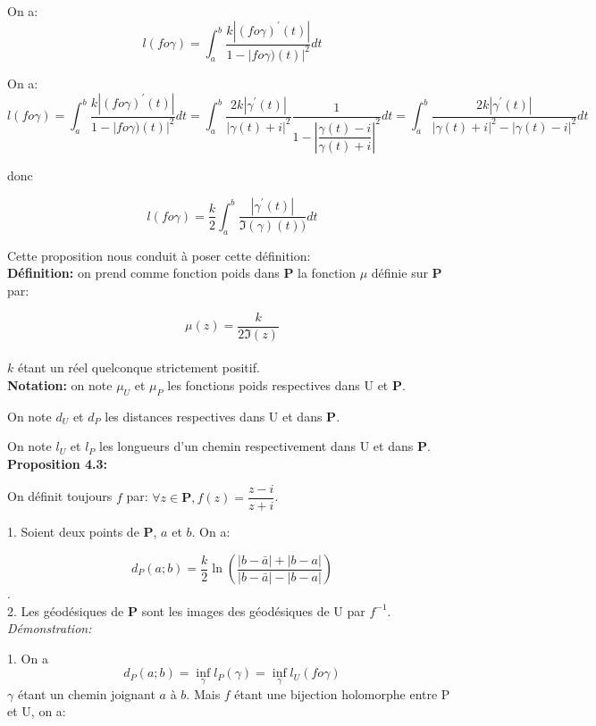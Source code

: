 \documentclass[a4paper, 12pt, twoside]{book}
\begin{document}
On a:
$$l(fo\gamma)=\int_{a}^{b}\dfrac{k|(fo\gamma)^{'}(t)|}{1-|fo\gamma)(t)|^{2}}dt$$

On a:
$$l(fo\gamma)=\int_{a}^{b}\dfrac{k|(fo\gamma)^{'}(t)|}{1-|fo\gamma)(t)|^{2}}dt=\int_{a}^{b}\dfrac{2k|\gamma^{'}(t)|}{|\gamma(t)+i|^{2}}\dfrac{1}{1-|\dfrac{\gamma(t)-i}{\gamma(t)+i}|^{2}}dt=\int_{a}^{b}\dfrac{2k|\gamma^{'}(t)|}{|\gamma(t)+i|^{2}-|\gamma(t)-i|^{2}}dt$$ 

donc


$$l(fo\gamma)=\dfrac{k}{2}\int_{a}^{b}\dfrac{|\gamma^{'}(t)|}{\Im(\gamma)(t))}dt$$





Cette proposition nous conduit à poser cette définition:\\

\textbf{Définition:} on prend comme fonction poids dans \textbf{P} la fonction $\mu$ définie sur \textbf{P} par:\

$$\mu(z)= \dfrac{k}{2\Im(z)}$$\\ $k$ étant un réel quelconque strictement positif.\\


\textbf{Notation:} on note $\mu_{U}$ et $\mu_{P}$ les fonctions poids respectives dans U et \textbf{P}.\

On note $d_{U}$ et $d_{P}$ les distances respectives dans U et dans \textbf{P}.\

On note $l_{U}$ et $l_{P}$ les longueurs d'un chemin respectivement dans U et dans \textbf{P}.\\




\newpage  \textbf{Proposition 4.3:}

 On définit toujours $f$ par: $\forall z\in \boldsymbol{P}, f(z)=\dfrac{z-i}{z+i}$.\
 
1. Soient deux points de \textbf{P}, $a$ et $b$. On a:\

$$d_{P}(a; b)= \dfrac{k}{2}\ln(\dfrac{|b-\bar{a}|+|b-a|}{|b-\bar{a}|-|b-a|})$$.\\

2. Les géodésiques de \textbf{P} sont les images des géodésiques de U par $f^{-1}$.\\


\textit{Démonstration:}\


1. On a  $$d_{P}(a; b)=\inf_{\gamma}l_{P}(\gamma)=\inf_{\gamma}l_{U}(fo\gamma)$$
$\gamma$ étant un chemin joignant $a$ à $b$. Mais $f$ étant une bijection holomorphe entre P et U, on a:\
\end{document}
